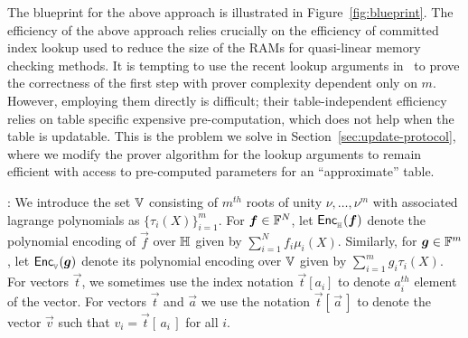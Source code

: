 The blueprint for the above approach is illustrated in Figure~\ref{fig:blueprint}.
The efficiency of the above approach relies crucially on the efficiency of committed index lookup used to
reduce the size of the RAMs for quasi-linear memory checking methods. It is tempting to use the recent lookup arguments
in~\cite{CCS:ZBKMNS22,EPRINT:PosKat22,EPRINT:EagFioGab22} to prove the correctness of the first step with prover complexity dependent only on $m$.
However, employing them directly is difficult; their table-independent efficiency relies on
table specific expensive pre-computation, which does not help when the table is updatable. This is the problem we solve
in Section~\ref{sec:update-protocol}, where we modify the prover algorithm for the lookup arguments to remain efficient
with access to pre-computed parameters for an ``approximate'' table.

:
We introduce the set $\mathbb{V}$ consisting of $m^{th}$ roots of unity
$\nu,\ldots,\nu^m$ with associated lagrange polynomials as $\{\tau_i(X)\}_{i=1}^m$. For $\vec{f}\in \F^N$, let
$\enc{f}{\setN}$ denote the polynomial encoding of $\vec{f}$ over $\mathbb{H}$ given by $\sum_{i=1}^N f_i\mu_i(X)$. Similarly,
for $\vec{g}\in \F^m$, let $\enc{g}{\setV}$ denote its polynomial encoding over $\mathbb{V}$ given by $\sum_{i=1}^m g_i\tau_i(X)$. 
For vectors $\vec{t}$, we sometimes use the index notation $\vec{t}[a_i]$ to denote $a_i^{th}$ element of the vector. For vectors
$\vec{t}$ and $\vec{a}$ we use the notation $\vec{t}[\,\vec{a}\,]$ to denote the vector $\vec{v}$ such that $v_i=\vec{t}[\,a_i\,]$ for all $i$.


